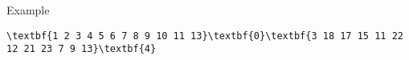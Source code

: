 Example
 
\begin{verbatim}
\textbf{1 2 3 4 5 6 7 8 9 10 11 13}\textbf{0}\textbf{3 18 17 15 11 22 12 21 23 7 9 13}\textbf{4}\end{verbatim}